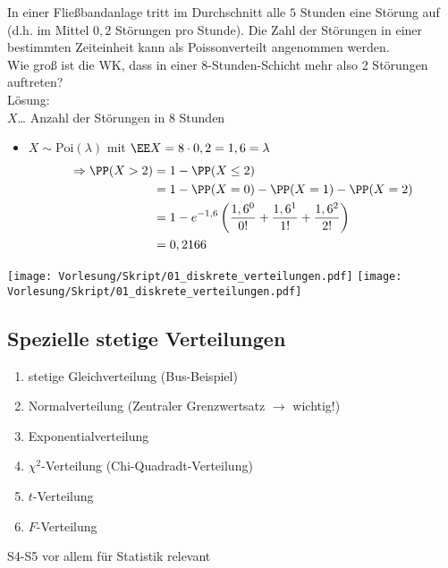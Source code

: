 \documentclass{scrreprt}
\begin{document}
 In einer Fließbandanlage tritt im Durchschnitt alle $5$ Stunden eine Störung auf (d.h. im Mittel $0,2$ Störungen pro Stunde). Die Zahl der Störungen in einer bestimmten Zeiteinheit kann als Poissonverteilt angenommen werden.\\
Wie groß ist die WK, dass in einer 8-Stunden-Schicht mehr also 2 Störungen auftreten?\\
Lösung:\\
$X$… Anzahl der Störungen in 8 Stunden
\begin{itemize}
\item $X\sim \mathrm{Poi}(\lambda)$ mit $\EE X = 8 \cdot 0,2 = 1,6 = \lambda$
\begin{align*}
\Rightarrow \PP(X >2) &= 1- \PP(X\leq 2) \\
&= 1- \PP(X=0) - \PP(X=1) - \PP(X=2)\\
&= 1-e^{-1,6}\left(\frac{1,6^0}{0!}+\frac{1,6^1}{1!}+\frac{1,6^2}{2!}\right)\\
&= 0,2166
\end{align*}
\end{itemize}

\begin{center}
\texttt{[image: Vorlesung/Skript/01\_diskrete\_verteilungen.pdf]}
\texttt{[image: Vorlesung/Skript/01\_diskrete\_verteilungen.pdf]}
\end{center}

\subsection{Spezielle stetige Verteilungen}

\begin{enumerate}[label=(D\arabic*)]
\item stetige Gleichverteilung (Bus-Beispiel)
\item Normalverteilung (Zentraler Grenzwertsatz $\to$ wichtig!)
\item Exponentialverteilung
\item $\chi^2$-Verteilung (Chi-Quadradt-Verteilung)
\item $t$-Verteilung
\item $F$-Verteilung
\end{enumerate}
S4-S5 vor allem für Statistik relevant
\end{document}
